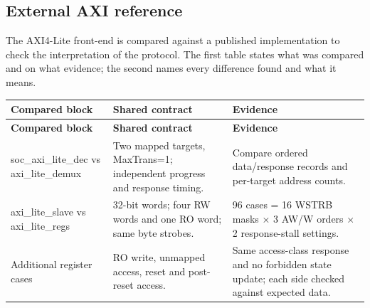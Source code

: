 \documentclass[11pt]{article}
\begin{document}
\subsection{External AXI reference}
\noindent The AXI4-Lite front-end is compared against a published implementation to check the interpretation of the protocol. The first table states what was compared and on what evidence; the second names every difference found and what it means.\par\medskip
{\small
\begin{longtable}{@{}L{0.3200\dimexpr\linewidth-24pt\relax}L{0.3500\dimexpr\linewidth-24pt\relax}L{0.3300\dimexpr\linewidth-24pt\relax}@{}}
\toprule
\textbf{Compared block} & \textbf{Shared contract} & \textbf{Evidence} \\ \midrule
\endfirsthead
\toprule
\textbf{Compared block} & \textbf{Shared contract} & \textbf{Evidence} \\ \midrule
\endhead
soc\_axi\_lite\_dec vs axi\_lite\_demux & Two mapped targets, MaxTrans=1; independent progress and response timing. & Compare ordered data/response records and per-target address counts. \\ \addlinespace[3pt]
axi\_lite\_slave vs axi\_lite\_regs & 32-bit words; four RW words and one RO word; same byte strobes. & 96 cases = 16 WSTRB masks × 3 AW/W orders × 2 response-stall settings. \\ \addlinespace[3pt]
Additional register cases & RO write, unmapped access, reset and post-reset access. & Same access-class response and no forbidden state update; each side checked against expected data. \\*
\bottomrule\end{longtable}}
\end{document}
